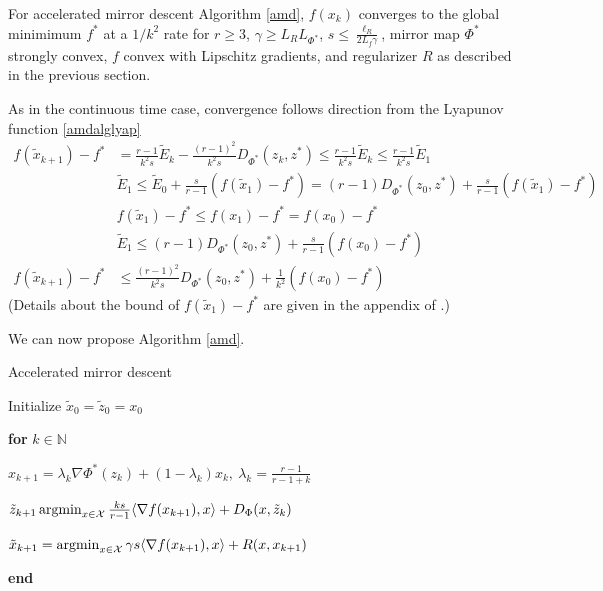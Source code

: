 \begin{theorem}
For accelerated mirror descent Algorithm \ref{amd}, $f(x_k)$ converges to the global minimimum $f^*$ at a $1/k^2$ rate for $r\geq 3$, $\gamma \geq L_R L_{\Phi^*}$, $s\leq \frac{\ell_R}{2L_f\gamma}$, mirror map $\Phi^*$ strongly convex, $f$ convex with Lipschitz gradients, and regularizer $R$ as described in the previous section.
\end{theorem}
\proofstart
As in the continuous time case, convergence follows direction from the Lyapunov function \eqref{amdalglyap}
\begin{align*}
f(\tilde x_{k+1}) - f^* &= \frac{r-1}{k^2s}\tilde E_k - \frac{(r-1)^2}{k^2s}D_{\Phi^*}(z_k,z^*) \leq \frac{r-1}{k^2s}\tilde E_k \leq \frac{r-1}{k^2s}\tilde E_1
\\
&\tilde E_1 \leq \tilde E_0  +\frac{s}{r-1} (f(\tilde x_{1}) - f^*) =  (r-1)D_{\Phi^*}(z_0,z^*) +\frac{s}{r-1} (f(\tilde x_{1}) - f^*)\\
&f(\tilde x_{1}) - f^* \leq f(x_{1}) - f^* = f(x_{0}) - f^*\\
&\tilde E_1 \leq (r-1)D_{\Phi^*}(z_0,z^*) +\frac{s}{r-1} (f(x_{0}) - f^*)\\
f(\tilde x_{k+1}) - f^* &\leq \frac{(r-1)^2}{k^2s} D_{\Phi^*}(z_0,z^*) +  \frac{1}{k^2}  (f(x_{0}) - f^*)
\end{align*}
(Details about the bound of $f(\tilde x_{1}) - f^*$ are given in the appendix of \citet{krichene2015accelerated}.)
\proofend

We can now propose Algorithm \ref{amd}. 

\begin{algorithm}
\caption{Accelerated mirror descent}\label{amd}
\begin{algorithmic}[1]
\item Initialize $\tilde x_0 = \tilde z_0 = x_0$
\item \textbf{for} {$k\in\mathbb{N}$}
\item \qquad $x_{k+1}  = \lambda_k \nabla \Phi^*(z_k) + (1-\lambda_k) x_{k} ,~ \lambda_k = \frac{r-1}{r-1+k}$
\item \qquad $\tilde z_{k+1}\argmin_{x\in\mathcal{X}} \frac{ks}{r-1} \langle  \nabla f(x_{k+1}), x \rangle + D_\Phi (x, \tilde z_k)$
\item \qquad$\tilde x_{k+1} = \argmin_{x\in\mathcal X} \gamma s \langle \nabla f(x_{k+1}), x \rangle + R(x,x_{k+1})$
\item \textbf{end}
\end{algorithmic}
\end{algorithm}


